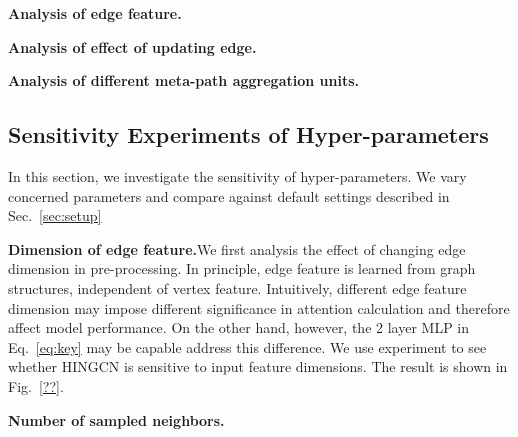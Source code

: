 \textbf{Analysis of edge feature.}

\textbf{Analysis of effect of updating edge.}

\textbf{Analysis of different meta-path aggregation units.}

\subsection{Sensitivity Experiments of Hyper-parameters}
In this section, we investigate the sensitivity of hyper-parameters. We vary concerned parameters and compare against default settings described in Sec.~\ref{sec:setup} 

\textbf{Dimension of edge feature.}We first analysis the effect of changing edge dimension in pre-processing. In principle, edge feature is learned from graph structures, independent of vertex feature. Intuitively, different edge feature dimension may impose different significance in attention calculation and therefore affect model performance. On the other hand, however, the 2 layer MLP in Eq.~\ref{eq:key} may be capable address this difference. We use experiment to see whether HINGCN is sensitive to input feature dimensions. The result is shown in Fig.~\ref{??}.

\textbf{Number of sampled neighbors.}






